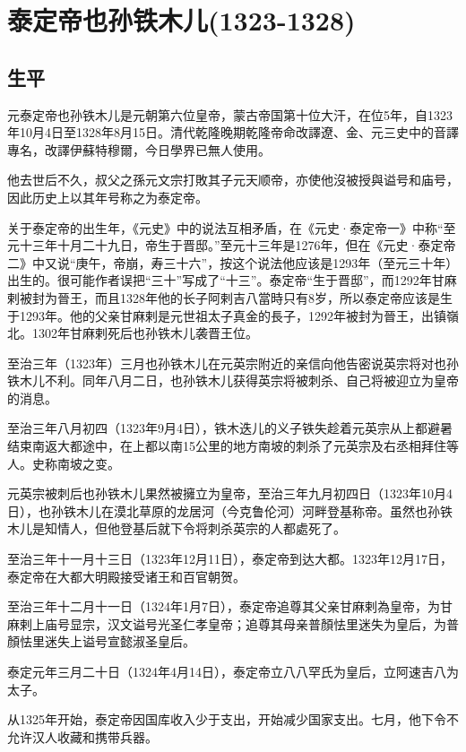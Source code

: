 
\section{泰定帝也孙铁木儿\tiny(1323-1328)}

\subsection{生平}

元泰定帝也孙铁木儿是元朝第六位皇帝，蒙古帝国第十位大汗，在位5年，自1323年10月4日至1328年8月15日。清代乾隆晚期乾隆帝命改譯遼、金、元三史中的音譯專名，改譯伊蘇特穆爾，今日學界已無人使用。

他去世后不久，叔父之孫元文宗打敗其子元天顺帝，亦使他沒被授與谥号和庙号，因此历史上以其年号称之为泰定帝。

关于泰定帝的出生年，《元史》中的说法互相矛盾，在《元史·泰定帝一》中称“至元十三年十月二十九日，帝生于晋邸。”至元十三年是1276年，但在《元史·泰定帝二》中又说“庚午，帝崩，寿三十六”，按这个说法他应该是1293年（至元三十年）出生的。很可能作者误把“三十”写成了“十三”。泰定帝“生于晋邸”，而1292年甘麻剌被封为晉王，而且1328年他的长子阿剌吉八當時只有8岁，所以泰定帝应该是生于1293年。他的父亲甘麻剌是元世祖太子真金的長子，1292年被封为晉王，出镇嶺北。1302年甘麻剌死后也孙铁木儿袭晋王位。

至治三年（1323年）三月也孙铁木儿在元英宗附近的亲信向他告密说英宗将对也孙铁木儿不利。同年八月二日，也孙铁木儿获得英宗将被刺杀、自己将被迎立为皇帝的消息。

至治三年八月初四（1323年9月4日），铁木迭儿的义子铁失趁着元英宗从上都避暑结束南返大都途中，在上都以南15公里的地方南坡的刺杀了元英宗及右丞相拜住等人。史称南坡之变。

元英宗被刺后也孙铁木儿果然被擁立为皇帝，至治三年九月初四日（1323年10月4日），也孙铁木儿在漠北草原的龙居河（今克鲁伦河）河畔登基称帝。虽然也孙铁木儿是知情人，但他登基后就下令将刺杀英宗的人都處死了。

至治三年十一月十三日（1323年12月11日），泰定帝到达大都。1323年12月17日，泰定帝在大都大明殿接受诸王和百官朝贺。

至治三年十二月十一日（1324年1月7日），泰定帝追尊其父亲甘麻剌為皇帝，为甘麻剌上庙号显宗，汉文谥号光圣仁孝皇帝；追尊其母亲普顏怯里迷失为皇后，为普顏怯里迷失上谥号宣懿淑圣皇后。

泰定元年三月二十日（1324年4月14日），泰定帝立八八罕氏为皇后，立阿速吉八为太子。

从1325年开始，泰定帝因国库收入少于支出，开始减少国家支出。七月，他下令不允许汉人收藏和携带兵器。

